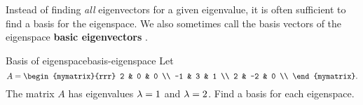 Instead of finding {\em all} eigenvectors for a given eigenvalue, it
is often sufficient to find a basis for the eigenspace. We also
sometimes call the basis vectors of the eigenspace \textbf{basic
  eigenvectors}%
%
%
.

\begin{example}{Basis of eigenspace}{basis-eigenspace}
  Let
  \begin{equation*}
    A = \begin{mymatrix}{rrr}
      2  &  0 & 0 \\
      -1 &  3 & 1 \\
      2  & -2 & 0 \\
    \end{mymatrix}.
  \end{equation*}
  The matrix $A$ has eigenvalues $\lambda=1$ and $\lambda=2$. Find a
  basis for each eigenspace.
\end{example}

